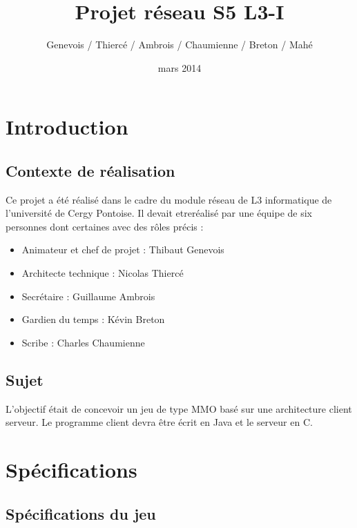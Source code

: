 \documentclass[11pt, a4paper]{report}
\title{Projet réseau S5 L3-I}
\author{Genevois / Thiercé / Ambrois / Chaumienne / Breton / Mahé}
\date{mars 2014}
\begin{document}
\maketitle
\renewcommand{\contentsname}{Sommaire}
\tableofcontents

\part{Introduction}

  \chapter{Contexte de réalisation}
    
    Ce projet a été réalisé dans le cadre du module réseau de L3 informatique de l'université de Cergy Pontoise. Il devait etreréalisé
    par une équipe de six personnes dont certaines avec des rôles précis :
    \newline
    
    \begin{itemize}
    
     \item Animateur et chef de projet : Thibaut Genevois
     \item Architecte technique : Nicolas Thiercé
     \item Secrétaire : Guillaume Ambrois
     \item Gardien du temps : Kévin Breton
     \item Scribe : Charles Chaumienne
     
    \end{itemize}
    
  \chapter{Sujet}
    
    L'objectif était de concevoir un jeu de type MMO basé sur une architecture client serveur. Le programme client devra
    être écrit en Java et le serveur en C.
    
\part{Spécifications}

  \chapter{Spécifications du jeu}
    
\end{document}
